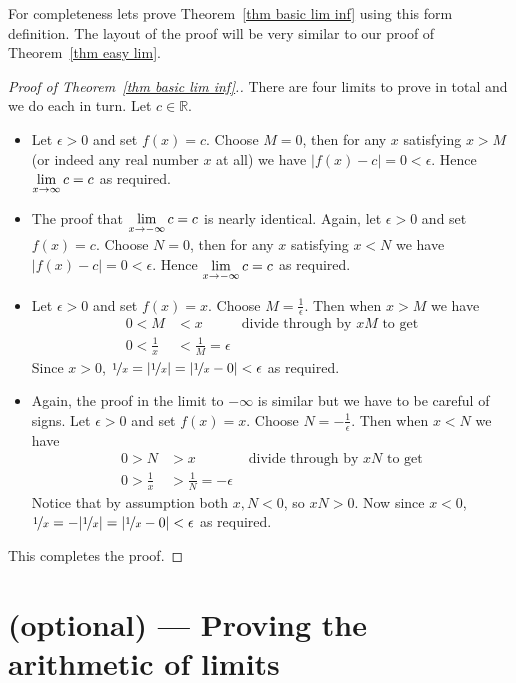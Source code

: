 For completeness lets prove Theorem~\ref{thm basic lim inf} using this form
definition. The layout of the proof will be very similar to our proof of
Theorem~\ref{thm easy lim}.
\begin{proof}[Proof of Theorem~\ref{thm basic lim inf}.]
There are four limits to prove in total and we do each in turn. Let $c \in
\mathbb{R}$.
\begin{itemize}
 \item Let $\epsilon>0$ and set $f(x)=c$. Choose $M=0$, then for any
$x$ satisfying $x>M$ (or indeed any real number $x$ at all) we have
$|f(x)-c| = 0 <\epsilon$. Hence $\displaystyle \lim_{x \to \infty} c = c$ as required.
\item The proof that $\displaystyle \lim_{x \to -\infty} c = c$ is nearly identical.
Again, let $\epsilon>0$ and set $f(x)=c$. Choose $N=0$, then for any
$x$ satisfying $x<N$ we have $|f(x)-c| = 0 <\epsilon$. Hence $\displaystyle \lim_{x \to
-\infty} c = c$ as required.
\item Let $\epsilon>0$ and set $f(x)=x$. Choose $M = \frac{1}{\epsilon}$. Then
when $x>M$ we have
\begin{align*}
  0 < M & < x  & \text{divide through by $xM$ to get}\\
  0 < \frac{1}{x} & < \frac{1}{M} = \epsilon
\end{align*}
Since $x>0$, $\nicefrac{1}{x} = |\nicefrac{1}{x}| = |\nicefrac{1}{x} - 0| <
\epsilon$ as required.

\item Again, the proof in the limit to $-\infty$ is similar but we have to be
careful of signs. Let $\epsilon>0$ and set $f(x)=x$. Choose $N
= -\frac{1}{\epsilon}$. Then when $x< N$ we have
\begin{align*}
  0 > N & > x  &\text{ divide through by $xN$ to get}\\
  0 > \frac{1}{x} &> \frac{1}{N} = -\epsilon
\end{align*}
Notice that by assumption both $x,N<0$, so $xN>0$. Now since $x<0$,
$\nicefrac{1}{x} = -|\nicefrac{1}{x}| = |\nicefrac{1}{x} - 0| < \epsilon$ as
required.
\end{itemize}
This completes the proof.

\end{proof}

\section{(optional) --- Proving the arithmetic of limits}\label{sec proof arith lim}


